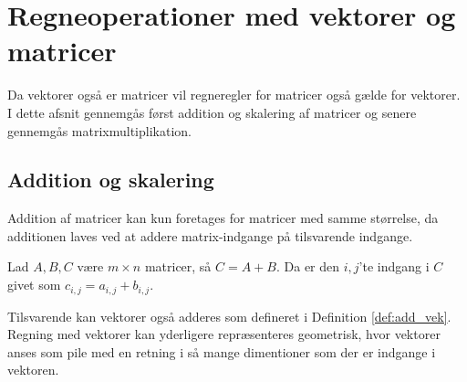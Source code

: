 \section{Regneoperationer med vektorer og matricer}

Da vektorer også er matricer vil regneregler for matricer også gælde for vektorer. I dette afsnit gennemgås først addition og skalering af matricer og senere gennemgås matrixmultiplikation.\\

\subsection{Addition og skalering}
Addition af matricer kan kun foretages for matricer med samme størrelse, da additionen laves ved at addere matrix-indgange på tilsvarende indgange.

\begin{defn}
Lad $A, B, C$ være $m \times n$ matricer, så $C=A+B$. Da er den $i,j$'te indgang i $C$ givet som $c_{i,j} = a_{i,j} + b_{i,j}$. 
\end{defn}




Tilsvarende kan vektorer også adderes som defineret i Definition \ref{def:add_vek}. Regning med vektorer kan yderligere repræsenteres geometrisk, hvor vektorer anses som pile med en retning i så mange dimentioner som der er indgange i vektoren.

